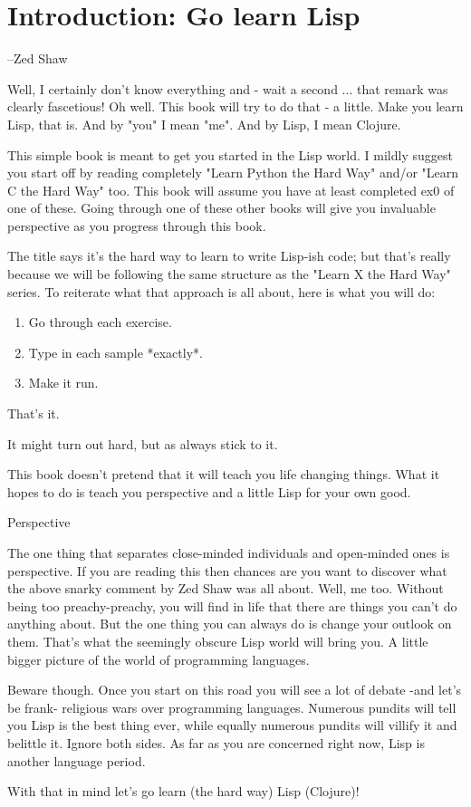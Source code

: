 \chapter{Introduction: Go learn Lisp}

--Zed Shaw

Well, I certainly don't know everything and - wait a second ... that remark was clearly fascetious! Oh well. This book will try to do that - a little. Make you learn Lisp, that is. And by "you" I mean "me". And by Lisp, I mean Clojure.

This simple book is meant to get you started in the Lisp world. I mildly suggest you start off by reading completely "Learn Python the Hard Way" and/or "Learn C the Hard Way" too. This book will assume you have at least completed ex0 of one of these. Going through one of these other books will give you invaluable perspective as you progress through this book. 

The title says it's the hard way to learn to write Lisp-ish code; but that's really because we will be following the same structure as the "Learn X the Hard Way" series. To reiterate what that approach is all about, here is what you will do:

\begin{enumerate}
\item Go through each exercise.
\item Type in each sample *exactly*.
\item Make it run.
\end{enumerate}

That's it.  

It might turn out hard, but as always stick to it.

This book doesn't pretend that it will teach you life changing things. What it hopes to do is teach you perspective and a little Lisp for your own good.

{\Large Perspective}

The one thing that separates close-minded individuals and open-minded ones is perspective. If you are reading this then chances are you want to discover what the above snarky comment by Zed Shaw was all about. Well, me too. Without being too preachy-preachy, you will find in life that there are things you can't do anything about. But the one thing you can always do is change your outlook on them. That's what the seemingly obscure Lisp world will bring you. A little bigger picture of the world of programming languages.

Beware though. Once you start on this road you will see a lot of debate -and let's be frank- religious wars over programming languages. Numerous pundits will tell you Lisp is the best thing ever, while equally numerous pundits will villify it and belittle it. Ignore both sides. As far as you are concerned right now, Lisp is another language period.

With that in mind let's go learn (the hard way) Lisp (Clojure)! 